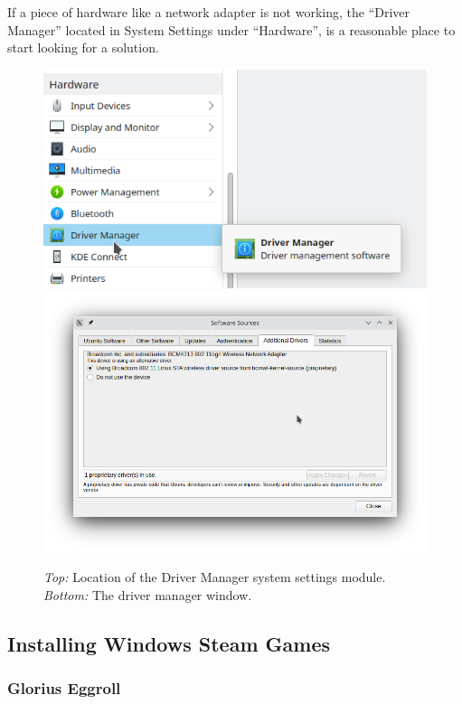 \documentclass[a4paper, 12pt]{article}
\begin{document}
If a piece of hardware like a network adapter is not working, the ``Driver Manager'' located in System
Settings under ``Hardware'', is a reasonable place to start looking for a solution.

\begin{figure}[h]
 \centering
 \includegraphics[width=0.6\linewidth]{images/driver_manager_location}
 \includegraphics[width=0.6\linewidth]{images/driver_manager_window}
 \caption{\textit{Top:} Location of the Driver Manager system settings module. \textit{Bottom:} The driver
 manager window.}\label{fig:drivers}
\end{figure}

\subsection{Installing Windows Steam Games}

\subsubsection{Glorius Eggroll}

\printbibliography
\end{document}
